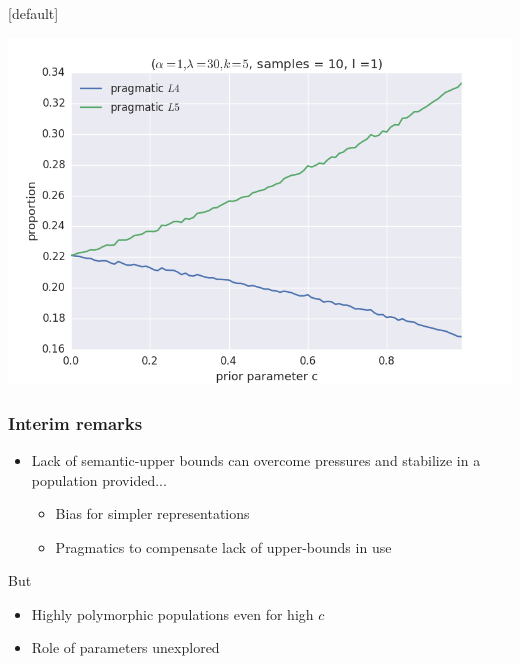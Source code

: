 \documentclass{beamer} %
\makeatletter
\newenvironment{withoutheadline}{
        \setbeamertemplate{headline}[default]
        \def\beamer@entrycode{\vspace*{-\headheight}}
    }{}
\makeatother
\begin{document}
\begin{withoutheadline}
\begin{frame}
\includegraphics[width=\linewidth,height=\textheight,keepaspectratio]{03cost-with-l1}

\end{frame}

\begin{frame}
  \frametitle{Interim remarks}
  \begin{itemize}
	\item Lack of semantic-upper bounds can overcome pressures and stabilize in a population provided...
	  \begin{itemize}
		\item Bias for simpler representations
		\item Pragmatics to compensate lack of upper-bounds in use
	  \end{itemize}
  \end{itemize}
  But

  \begin{itemize}
    \item Highly polymorphic populations even for high $c$
    \item Role of parameters unexplored
  \end{itemize}

\end{frame}


\end{withoutheadline}
\end{document}
